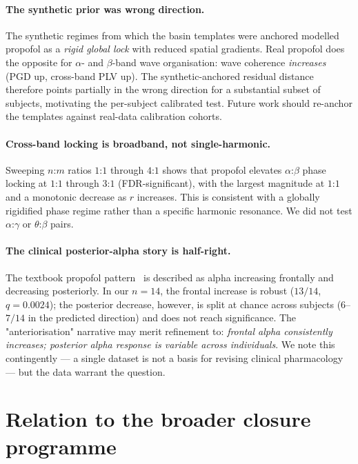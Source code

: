 \documentclass[11pt,a4paper]{article}
\begin{document}
\paragraph{The synthetic prior was wrong direction.}
The synthetic regimes from which the basin templates were anchored modelled propofol as a \emph{rigid global lock} with reduced spatial gradients. Real propofol does the opposite for $\alpha$- and $\beta$-band wave organisation: wave coherence \emph{increases} (PGD up, cross-band PLV up). The synthetic-anchored residual distance therefore points partially in the wrong direction for a substantial subset of subjects, motivating the per-subject calibrated test. Future work should re-anchor the templates against real-data calibration cohorts.

\paragraph{Cross-band locking is broadband, not single-harmonic.}
Sweeping $n$:$m$ ratios $1$:$1$ through $4$:$1$ shows that propofol elevates $\alpha$:$\beta$ phase locking at $1$:$1$ through $3$:$1$ (FDR-significant), with the largest magnitude at $1$:$1$ and a monotonic decrease as $r$ increases. This is consistent with a globally rigidified phase regime rather than a specific harmonic resonance. We did not test $\alpha$:$\gamma$ or $\theta$:$\beta$ pairs.

\paragraph{The clinical posterior-alpha story is half-right.}
The textbook propofol pattern~\cite{purdon2013electroencephalogram} is described as alpha increasing frontally and decreasing posteriorly. In our $n=14$, the frontal increase is robust ($13/14$, $q=0.0024$); the posterior decrease, however, is split at chance across subjects ($6$--$7/14$ in the predicted direction) and does not reach significance. The "anteriorisation" narrative may merit refinement to: \emph{frontal alpha consistently increases; posterior alpha response is variable across individuals}. We note this contingently --- a single dataset is not a basis for revising clinical pharmacology --- but the data warrant the question.

\section{Relation to the broader closure programme}\label{sec:relation}
\end{document}
